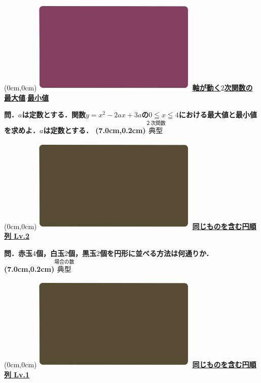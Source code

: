 \documentclass[10pt,
fleqn,
dvipdfmx,
uplatex
]{jsarticle}
\begin{document}
\at(0cm,0cm){\includegraphics[width=8cm,bb=0 0 1920 1080]{./youtube/thumbnails/templates/smart_background/２次関数.jpeg}}
{\color{orange}\bf\boldmath\Large\underline{軸が動く$2$次関数の最大値$\cdot$最小値}}\vspace{0.3zw}

\Large 
\bf\boldmath 問．$a$は定数とする．関数$y=x^2-2ax+3a$の$0\leqq x\leqq 4$における最大値と最小値を求めよ．$a$は定数とする．
\at(7.0cm,0.2cm){\small\color{bradorange}$\overset{\text{２次関数}}{\text{典型}}$}


\newpage



\at(0cm,0cm){\includegraphics[width=8cm,bb=0 0 1920 1080]{./youtube/thumbnails/templates/smart_background/場合の数.jpeg}}
{\color{orange}\bf\boldmath\Large\underline{同じものを含む円順列 Lv.2 }}\vspace{0.3zw}

\huge 
\bf\boldmath 問．赤玉$4$個，白玉$2$個，黒玉$2$個を円形に並べる方法は何通りか．
\at(7.0cm,0.2cm){\small\color{bradorange}$\overset{\text{場合の数}}{\text{典型}}$}


\newpage



\at(0cm,0cm){\includegraphics[width=8cm,bb=0 0 1920 1080]{./youtube/thumbnails/templates/smart_background/場合の数.jpeg}}
{\color{orange}\bf\boldmath\Large\underline{同じものを含む円順列 Lv.1 }}\vspace{0.3zw}
\end{document}
